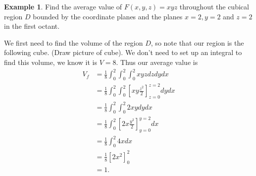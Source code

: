 \documentclass[12pt, letter]{article}
\theoremstyle{plain}
\numberwithin{theorem}{section}
\theoremstyle{definition}
\newtheorem{example}[theorem]{Example}
\begin{document}
\begin{example}
Find the average value of $F(x,y,z) = xyz$ throughout the cubical region $D$ bounded by the coordinate planes and the planes $x=2, y=2$ and $z=2$ in the first octant.

\bigskip

We first need to find the volume of the region $D$, so note that our region is the following cube. (Draw picture of cube). We don't need to set up an integral to find this volume, we know it is $V=8$. Thus our average value is
\begin{align*}
V_f &= \frac{1}{8} \int_0^2 \int_0^2 \int_0^2 xyzdzdydx\\
&= \frac{1}{8} \int_0^2 \int_0^2 \left[ xy\frac{z^2}{2} \right]_{z=0}^{z=2} dy dx\\
&= \frac{1}{8} \int_0^2 \int_0^2 2xy dy dx\\
&= \frac{1}{8} \int_0^2 \left[2x\frac{y^2}{2}\right]_{y=0}^{y=2} dx\\
&= \frac{1}{8} \int_0^2 4x dx\\
&= \frac{1}{8} \left[2x^2\right]_0^2\\
&= 1.
\end{align*}
\end{example}

\bigskip

\hrulefill

\bigskip
\end{document}
